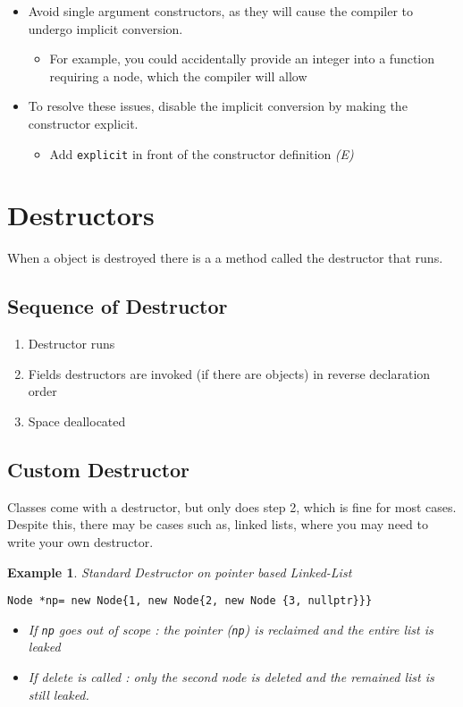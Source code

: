 \documentclass{article}
\newtheorem{ex}[theorem]{Example}
\newenvironment{ablock}[1]{%
    \tcolorbox[beamer,%
    noparskip,breakable,
    colback=lightcoral,colframe=darkred,%
    colbacklower=tomato!75!lightcoral,%
    title=#1]}%
    {\endtcolorbox}
\begin{document}
\begin{ablock}{Note:}
\begin{itemize}
\item Avoid single argument constructors, as they will cause the compiler to undergo implicit conversion.
\begin{itemize}
\item For example, you could accidentally provide an integer into a function requiring a node, which the compiler will allow
\end{itemize}
\item To resolve these issues, disable the implicit conversion by making the constructor explicit. 
\begin{itemize}
\item Add \verb|explicit| in front of the constructor definition \textit{(E)}
\end{itemize}
\end{itemize}
\end{ablock}

\section{Destructors}

When a object is destroyed there is a a method called the destructor that runs. 

\subsection{Sequence of Destructor}
\begin{enumerate}
\item Destructor runs
\item Fields destructors are invoked (if there are objects) in reverse declaration order
\item Space deallocated 
\end{enumerate}

\subsection{Custom Destructor}

Classes come with a destructor, but only does step 2, which is fine for most cases. Despite this, there may be cases such as, linked lists, where you may need to write your own destructor.

\begin{ex} Standard Destructor on pointer based Linked-List
\begin{lstlisting}
Node *np= new Node{1, new Node{2, new Node {3, nullptr}}}
\end{lstlisting}
\begin{itemize}
\item If \verb|np| goes out of scope : the pointer (\verb|np|) is reclaimed and the entire list is leaked 
\item If delete is called : only the second node is deleted and the remained list is still leaked. 
\end{itemize}
\end{ex}
\end{document}
